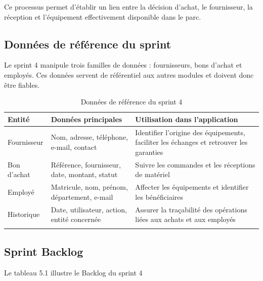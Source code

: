 Ce processus permet d'établir un lien entre la décision d'achat, le fournisseur, la réception et l'équipement effectivement disponible dans le parc.

\subsection{Données de référence du sprint}

Le sprint 4 manipule trois familles de données : fournisseurs, bons d'achat et employés. Ces données servent de référentiel aux autres modules et doivent donc être fiables.

\begin{longtable}{|m{3.5cm}|m{5.5cm}|m{5cm}|}
\hline
\textbf{Entité} & \textbf{Données principales} & \textbf{Utilisation dans l'application} \\
\hline
\endhead
\endfoot
\endlastfoot
\hline
Fournisseur & Nom, adresse, téléphone, e-mail, contact & Identifier l'origine des équipements, faciliter les échanges et retrouver les garanties \\
\hline
Bon d'achat & Référence, fournisseur, date, montant, statut & Suivre les commandes et les réceptions de matériel \\
\hline
Employé & Matricule, nom, prénom, département, e-mail & Affecter les équipements et identifier les bénéficiaires \\
\hline
Historique & Date, utilisateur, action, entité concernée & Assurer la traçabilité des opérations liées aux achats et aux employés \\
\hline
\captionsetup{justification=centering,margin=1cm}
\caption{Données de référence du sprint 4}
\end{longtable}
    
\subsection{Sprint Backlog}
    
Le tableau 5.1 illustre le Backlog du sprint 4

